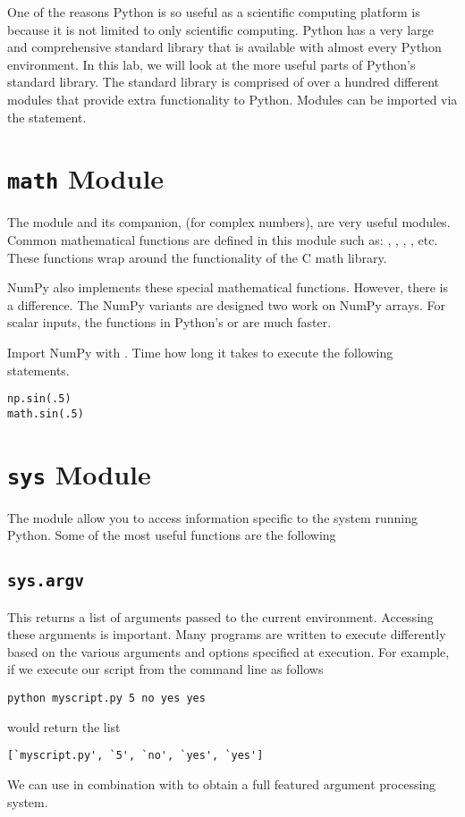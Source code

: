 

One of the reasons Python is so useful as a scientific computing platform is because
it is not limited to only scientific computing.  Python has a very large and comprehensive standard library that is available with almost every Python environment.
In this lab, we will look at the more useful parts of Python's standard library.  The standard library is comprised of over a hundred different modules that provide extra functionality to Python.
Modules can be imported via the  statement.

\section*{\texttt{math} Module}
The  module and its companion,  (for complex numbers), are very useful modules.
Common mathematical functions are defined in this module such as: , , , , etc.  These functions wrap around the functionality of the C math library.

\begin{problem}
NumPy also implements these special mathematical functions.  However, there is a difference.
The NumPy variants are designed two work on NumPy arrays.  For scalar inputs, the functions
in Python's  or  are much faster.

Import NumPy with .  Time how long it takes to execute the following statements.
\begin{lstlisting}
np.sin(.5)
math.sin(.5)
\end{lstlisting}
\end{problem}

\section*{\texttt{sys} Module}
The  module allow you to access information specific to the system running Python.  Some of the most useful functions are the following

\subsection*{\texttt{sys.argv}}
This returns a list of arguments passed to the current environment.  Accessing these arguments is important.  Many programs are written to execute differently based on the various arguments and options specified at execution.  For example, if we execute our script from the command line as follows
\begin{verbatim}
python myscript.py 5 no yes yes
\end{verbatim}
 would return the list
\begin{verbatim}
[`myscript.py', `5', `no', `yes', `yes']
\end{verbatim}
We can use  in combination with  to obtain a full featured argument processing system.

